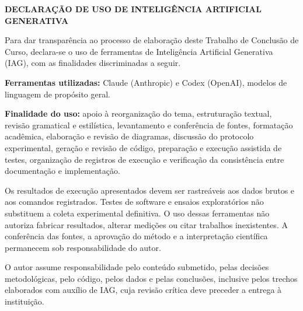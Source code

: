 \cleardoublepage
\thispagestyle{empty}

\begin{center}
\textbf{DECLARAÇÃO DE USO DE INTELIGÊNCIA ARTIFICIAL GENERATIVA}
\end{center}

\vspace{1.5cm}

Para dar transparência ao processo de elaboração deste Trabalho de Conclusão de Curso, declara-se o uso de ferramentas de Inteligência Artificial Generativa (IAG), com as finalidades discriminadas a seguir.

\textbf{Ferramentas utilizadas:} Claude (Anthropic) e Codex (OpenAI), modelos de linguagem de propósito geral.

\textbf{Finalidade do uso:} apoio à reorganização do tema, estruturação textual, revisão gramatical e estilística, levantamento e conferência de fontes, formatação acadêmica, elaboração e revisão de diagramas, discussão do protocolo experimental, geração e revisão de código, preparação e execução assistida de testes, organização de registros de execução e verificação da consistência entre documentação e implementação.

Os resultados de execução apresentados devem ser rastreáveis aos dados brutos e aos comandos registrados. Testes de software e ensaios exploratórios não substituem a coleta experimental definitiva. O uso dessas ferramentas não autoriza fabricar resultados, alterar medições ou citar trabalhos inexistentes. A conferência das fontes, a aprovação do método e a interpretação científica permanecem sob responsabilidade do autor.

O autor assume responsabilidade pelo conteúdo submetido, pelas decisões metodológicas, pelo código, pelos dados e pelas conclusões, inclusive pelos trechos elaborados com auxílio de IAG, cuja revisão crítica deve preceder a entrega à instituição.

\cleardoublepage
